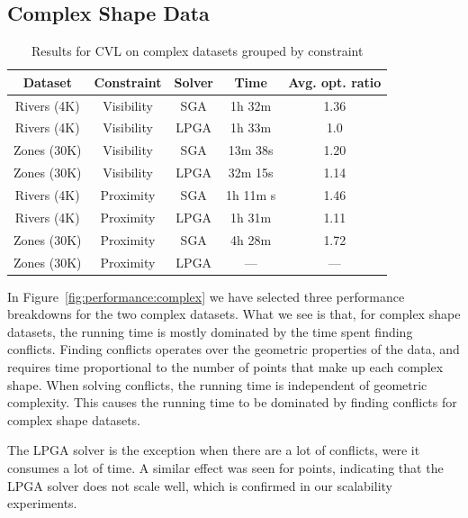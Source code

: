\subsection{Complex Shape Data}
\label{sec:exp:complex:shapes}

\begin{table}[htdp]
\caption{Results for CVL on complex datasets grouped by constraint}
\begin{center}
\begin{tabular}{|c|c|c|c|c|}
\hline
\textbf{Dataset} & \textbf{Constraint} & \textbf{Solver} & \textbf{Time} & \textbf{Avg. opt. ratio}\\ 
\hline
Rivers (4K) & Visibility & SGA & 1h 32m & 1.36 \\
Rivers (4K) & Visibility & LPGA & 1h 33m & 1.0 \\
Zones (30K) & Visibility & SGA & 13m 38s & 1.20 \\
Zones (30K) & Visibility & LPGA & 32m 15s & 1.14 \\
\hline
Rivers (4K)  & Proximity  & SGA& 1h 11m s & 1.46 \\
Rivers (4K)  & Proximity & LPGA & 1h 31m & 1.11 \\
Zones (30K) & Proximity & SGA & 4h 28m & 1.72 \\
Zones (30K) & Proximity & LPGA & --- & --- \\
\hline
\end{tabular}
\end{center}
\label{tab:results:overview}
\end{table}%



In Figure~\ref{fig:performance:complex} we have selected three performance breakdowns for the two complex datasets. What we see is that, for complex shape datasets, the running time is mostly dominated by the time spent finding conflicts. Finding conflicts operates over the geometric properties of the data, and requires time proportional to the number of points that make up each complex shape. When solving conflicts, the running time is independent of geometric complexity. This causes the running time to be dominated by finding conflicts for complex shape datasets.

The LPGA solver is the exception when there are a lot of conflicts, were it consumes a lot of time. A similar effect was seen for points, indicating that the LPGA solver does not scale well, which is confirmed in our scalability experiments.

